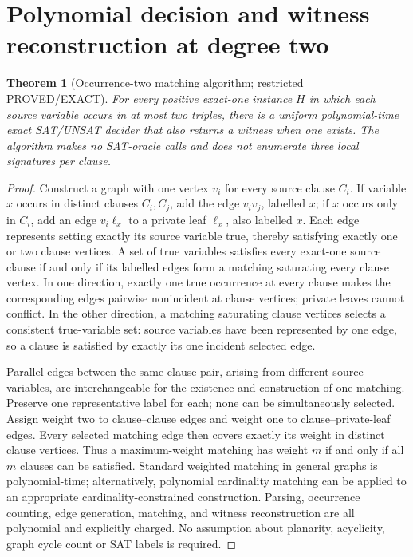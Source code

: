 \documentclass[11pt]{article}
\newtheorem{theorem}{Theorem}
\begin{document}
\section{Polynomial decision and witness reconstruction at degree two}
\begin{theorem}[Occurrence-two matching algorithm; restricted PROVED/EXACT]\label{th:match}
For every positive exact-one instance \(H\) in which each source variable occurs in at most two triples, there is a uniform polynomial-time exact SAT/UNSAT decider that also returns a witness when one exists. The algorithm makes no SAT-oracle calls and does not enumerate three local signatures per clause.
\end{theorem}
\begin{proof}
Construct a graph with one vertex \(v_i\) for every source clause \(C_i\). If variable \(x\) occurs in distinct clauses \(C_i,C_j\), add the edge \(v_iv_j\), labelled \(x\); if \(x\) occurs only in \(C_i\), add an edge \(v_i\ell_x\) to a private leaf \(\ell_x\), also labelled \(x\). Each edge represents setting exactly its source variable true, thereby satisfying exactly one or two clause vertices. A set of true variables satisfies every exact-one source clause if and only if its labelled edges form a matching saturating every clause vertex. In one direction, exactly one true occurrence at every clause makes the corresponding edges pairwise nonincident at clause vertices; private leaves cannot conflict. In the other direction, a matching saturating clause vertices selects a consistent true-variable set: source variables have been represented by one edge, so a clause is satisfied by exactly its one incident selected edge.

Parallel edges between the same clause pair, arising from different source variables, are interchangeable for the existence and construction of one matching. Preserve one representative label for each; none can be simultaneously selected. Assign weight two to clause--clause edges and weight one to clause--private-leaf edges. Every selected matching edge then covers exactly its weight in distinct clause vertices. Thus a maximum-weight matching has weight \(m\) if and only if all \(m\) clauses can be satisfied. Standard weighted matching in general graphs is polynomial-time; alternatively, polynomial cardinality matching can be applied to an appropriate cardinality-constrained construction. Parsing, occurrence counting, edge generation, matching, and witness reconstruction are all polynomial and explicitly charged. No assumption about planarity, acyclicity, graph cycle count or SAT labels is required.
\end{proof}
\end{document}
